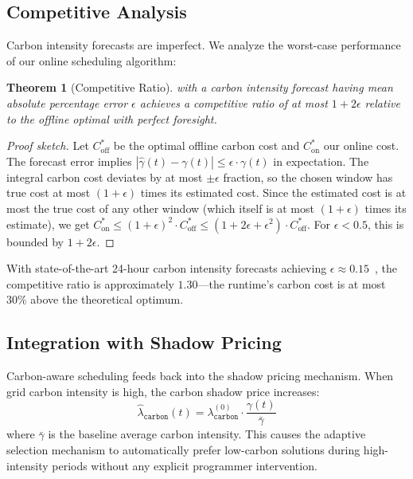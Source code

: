 \documentclass[11pt,a4paper]{article}
\newtheorem{theorem}{Theorem}[section]
\begin{document}
\subsection{Competitive Analysis}

Carbon intensity forecasts are imperfect.  We analyze the worst-case
performance of our online scheduling algorithm:

\begin{theorem}[Competitive Ratio]
\label{thm:competitive-ratio}
 with a carbon intensity forecast having mean absolute
percentage error $\epsilon$ achieves a competitive ratio of at most
$1 + 2\epsilon$ relative to the offline optimal with perfect foresight.
\end{theorem}

\begin{proof}[Proof sketch]
Let $C^*_{\mathrm{off}}$ be the optimal offline carbon cost and
$C^*_{\mathrm{on}}$ our online cost.  The forecast error implies
$|\hat{\gamma}(t) - \gamma(t)| \leq \epsilon \cdot \gamma(t)$ in expectation.
The integral carbon cost deviates by at most $\pm \epsilon$ fraction, so
the chosen window has true cost at most $(1+\epsilon)$ times its estimated
cost.  Since the estimated cost is at most the true cost of any other window
(which itself is at most $(1+\epsilon)$ times its estimate), we get
$C^*_{\mathrm{on}} \leq (1+\epsilon)^2 \cdot C^*_{\mathrm{off}}
\leq (1 + 2\epsilon + \epsilon^2) \cdot C^*_{\mathrm{off}}$.
For $\epsilon < 0.5$, this is bounded by $1 + 2\epsilon$.
\end{proof}

With state-of-the-art 24-hour carbon intensity forecasts achieving
$\epsilon \approx 0.15$~\cite{electricitymaps}, the competitive ratio is
approximately $1.30$---the runtime's carbon cost is at most 30\% above the
theoretical optimum.

\subsection{Integration with Shadow Pricing}

Carbon-aware scheduling feeds back into the shadow pricing mechanism.  When
grid carbon intensity is high, the carbon shadow price increases:
\[
  \hat{\lambda}_{\texttt{carbon}}(t) =
    \lambda_{\texttt{carbon}}^{(0)} \cdot
    \frac{\gamma(t)}{\bar{\gamma}}
\]
where $\bar{\gamma}$ is the baseline average carbon intensity.  This causes
the adaptive selection mechanism to automatically prefer low-carbon solutions
during high-intensity periods without any explicit programmer intervention.
\end{document}
